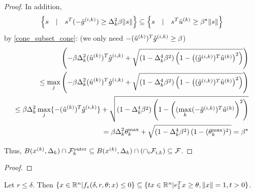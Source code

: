 \begin{proof}
In addition,
\begin{align*}
\left\{s\quad | \quad s^T(-{{\hat g}^{(i, k)}})\ge\Delta_k^2\beta\|s\| \right\}  \subseteq \left\{s\quad | \quad s^T{{\hat u}^{(k)}}\ge\beta^{\star}\|s\| \right\}
\end{align*}
by \cref{cone_subset_cone}: (\color{red}we only need $-({{\hat u}^{(k)}})^T{{\hat g}^{(i, k)}} \ge \beta$\color{black})
\begin{align*}
\left(-\beta\Delta_k^2({{\hat u}^{(k)}})^T{{\hat g}^{(i, k)}} + \sqrt{(1 - \Delta_k^4\beta^2)\left(1 - \left(({{\hat g}^{(i, k)}})^T\hat u^{(k)}\right)^2\right)}\right) \\
\le \max_j \left(-\beta\Delta_k^2({{\hat u}^{(k)}})^T{{{\hat g}^{(i, k)}}} + \sqrt{(1 - \Delta_k^4\beta^2)\left(1 - \left(({{\hat g}^{(i, k)}})^T{{\hat u}^{(k)}}\right)^2\right)}\right) \\
\le \beta\Delta_k^2 \max_j\{-({{\hat u}^{(k)}})^T{{\hat g}^{(i, k)}}\} + \sqrt{(1 - \Delta_k^4\beta^2)\left(1 - \left((\max_k(-{{\hat g}^{(i, k)}})^T{{\hat u}^{(k)}}\right)^2\right)} \\
= \beta\Delta_k^2 \theta^{\text{max}}_k + \sqrt{(1 - \Delta_k^4\beta^2)\left(1 - (\theta^{\text{max}}_k) ^2\right)} = \beta^{\star}
\end{align*}

Thus, $B({x^{(k)}}, \Delta_k) \cap {\mathcal {F}^{\text{outer}}_k} \subseteq B({x^{(k)}}, \Delta_k) \cap \left(\cap_i {\mathcal F_{i, k}} \right)\subseteq {\mathcal F}$.
\end{proof}

\begin{theorem}
\end{theorem}

\begin{proof}

\end{proof}





\color{black}




\begin{theorem}
Let $r \le \delta$.
Then $\{x \in {\mathbb R^{n}} | f_e(\delta, r, \theta; x) \le 0\} \subseteq \{tx\in{\mathbb R^{n}}| e_1^T x \ge \theta,\|x\|=1, t>0\}$.
\end{theorem}




